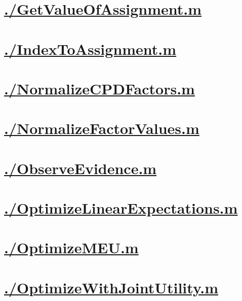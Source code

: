 \documentclass{article}
\begin{document}
\section{\hyperref[toc]{./GetValueOfAssignment.m}}

\section{\hyperref[toc]{./IndexToAssignment.m}}

\section{\hyperref[toc]{./NormalizeCPDFactors.m}}

\section{\hyperref[toc]{./NormalizeFactorValues.m}}

\section{\hyperref[toc]{./ObserveEvidence.m}}

\section{\hyperref[toc]{./OptimizeLinearExpectations.m}}

\section{\hyperref[toc]{./OptimizeMEU.m}}

\section{\hyperref[toc]{./OptimizeWithJointUtility.m}}

\end{document}
